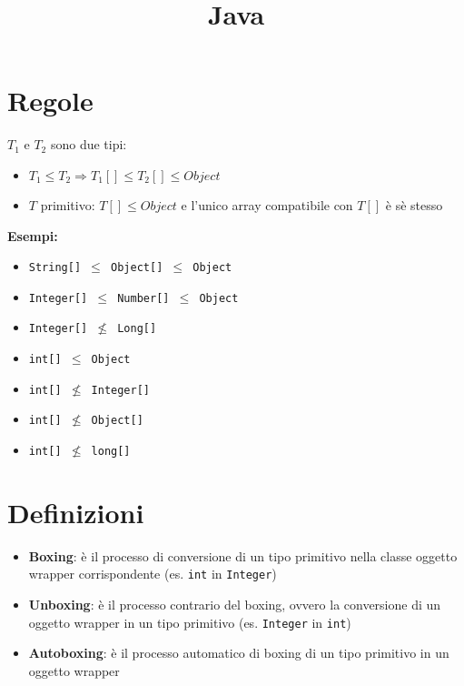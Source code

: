 \documentclass[10pt]{article}
\title{Java}
\author{}
\date{}
\begin{document}
\maketitle
{}
\section{Regole}
$T_{1} \text{ e } T_{2}$ sono due tipi:
\begin{itemize}
    \item $T_{1}\leq T_{2}\Rightarrow T_{1}[]\leq T_{2}[] \leq Object$
    \item $T$ primitivo: $T[]\leq Object$ e l'unico array compatibile con $T[]$ è sè stesso
\end{itemize}
\textbf{Esempi:}
\begin{itemize}
    \item \texttt{String[] $\leq$ Object[] $\leq$ Object}
    \item \texttt{Integer[] $\leq$ Number[] $\leq$ Object}
    \item \texttt{Integer[] $\nleq$ Long[]}
    \item \texttt{int[] $\leq$ Object}
    \item \texttt{int[] $\nleq$ Integer[]}
    \item \texttt{int[] $\nleq$ Object[]}
    \item \texttt{int[] $\nleq$ long[]}
\end{itemize}
\section{Definizioni}
\begin{itemize}
    \item \textbf{Boxing}: è il processo di conversione di un tipo primitivo nella classe oggetto wrapper corrispondente (es. \texttt{int} in \texttt{Integer})
    \item \textbf{Unboxing}: è il processo contrario del boxing, ovvero la conversione di un oggetto wrapper in un tipo primitivo (es. \texttt{Integer} in \texttt{int})
    \item \textbf{Autoboxing}: è il processo automatico di boxing di un tipo primitivo in un oggetto wrapper
\end{itemize}
\end{document}
